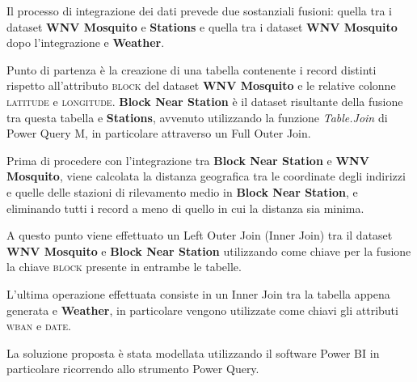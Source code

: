 Il processo di integrazione dei dati prevede due sostanziali fusioni: quella 
tra i dataset \textbf{WNV Mosquito} e \textbf{Stations} e quella tra i dataset 
\textbf{WNV Mosquito} dopo l'integrazione e \textbf{Weather}.

Punto di partenza è la creazione di una tabella contenente i record distinti 
rispetto all'attributo \textsc{block} del dataset \textbf{WNV Mosquito} e le 
relative colonne \textsc{latitude} e \textsc{longitude}. 
\textbf{Block Near Station} è il dataset risultante della fusione tra questa 
tabella e \textbf{Stations}, avvenuto utilizzando la funzione 
\textit{Table.Join} di Power Query M, in particolare attraverso un 
Full Outer Join. 

Prima di procedere con l'integrazione tra \textbf{Block Near Station} e 
\textbf{WNV Mosquito}, viene calcolata la distanza geografica tra le 
coordinate degli indirizzi e quelle delle stazioni di rilevamento medio in 
\textbf{Block Near Station}, e eliminando tutti i record a meno di quello in 
cui la distanza sia minima.

A questo punto viene effettuato un Left Outer Join (Inner Join) tra il 
dataset \textbf{WNV Mosquito} e \textbf{Block Near Station} utilizzando come 
chiave per la fusione la chiave \textsc{block} presente in entrambe 
le tabelle.

L'ultima operazione effettuata consiste in un Inner Join tra la tabella appena 
generata e \textbf{Weather}, in particolare vengono utilizzate come chiavi gli 
attributi \textsc{wban} e \textsc{date}.

La soluzione proposta è stata modellata utilizzando il software Power BI in 
particolare ricorrendo allo strumento Power Query.

